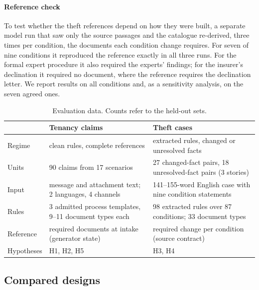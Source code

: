 \paragraph{Reference check}
To test whether the theft references depend on how they were built, a separate model run that saw only the source passages and the catalogue re-derived, three times per condition, the documents each condition change requires. For seven of nine conditions it reproduced the reference exactly in all three runs. For the formal expert procedure it also required the experts' findings; for the insurer's declination it required no document, where the reference requires the declination letter. We report results on all conditions and, as a sensitivity analysis, on the seven agreed ones.

\begin{table}[t]
\caption{Evaluation data. Counts refer to the held-out sets.}
\label{tab:data}
\small
\begin{tabularx}{\linewidth}{@{}lXX@{}}
\toprule
& Tenancy claims & Theft cases \\
\midrule
Regime & clean rules, complete references & extracted rules, changed or unresolved facts \\
Units & 90 claims from 17 scenarios & 27 changed-fact pairs, 18 unresolved-fact pairs (3 stories) \\
Input & message and attachment text; 2 languages, 4 channels & 141--155-word English case with nine condition statements \\
Rules & 3 admitted process templates, 9--11 document types each & 98 extracted rules over 87 conditions; 33 document types \\
Reference & required documents at intake (generator state) & required change per condition (source contract) \\
Hypotheses & H1, H2, H5 & H3, H4 \\
\bottomrule
\end{tabularx}
\end{table}

\subsection{Compared designs}
\label{sec:designs}

